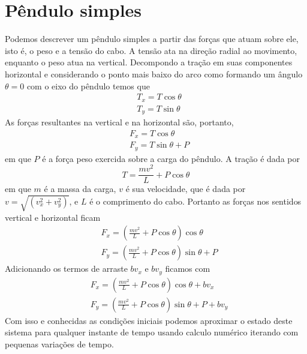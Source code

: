 \documentclass[12pt]{article}
\begin{document}
    \section*{Pêndulo simples}
    Podemos descrever um pêndulo simples a partir das forças que atuam sobre ele, isto é, o peso e
    a tensão do cabo. A tensão ata na direção radial ao movimento, enquanto o peso atua na vertical.
    Decompondo a tração em suas componentes horizontal e considerando o ponto mais baixo do arco como 
    formando um ângulo $\theta = 0$ com o eixo do pêndulo temos que
    \begin{equation*}
        \begin{aligned}
            &T_x = T\cos\theta\\
            &T_y = T\sin\theta
        \end{aligned}
    \end{equation*}
    As forças resultantes na vertical e na horizontal são, portanto, 
    \begin{equation*}
        \begin{aligned}
            &F_x = T\cos\theta\\
            &F_y = T\sin\theta + P
        \end{aligned}
    \end{equation*}
    em que $P$ é a força peso exercida sobre a carga do pêndulo. A tração é dada por
    \begin{equation*}
        T = \frac{mv^2}{L} + P\cos\theta
    \end{equation*}
    em que $m$ é a massa da carga, $v$ é sua velocidade, que é dada por $v = \sqrt{(v_x^2 + v_y^2)}$,
    e $L$ é o comprimento do cabo. Portanto as forças nos sentidos vertical e horizontal ficam
    \begin{equation*}
        \begin{aligned}
            &F_x = \left(\frac{mv^2}{L} + P\cos\theta\right)\cos\theta\\
            &F_y = \left(\frac{mv^2}{L} + P\cos\theta\right)\sin\theta + P
        \end{aligned}
    \end{equation*}
    Adicionando os termos de arraste $bv_x$ e $bv_y$ ficamos com
    \begin{equation*}
        \begin{aligned}
            &F_x = \left(\frac{mv^2}{L} + P\cos\theta\right)\cos\theta + bv_x\\
            &F_y = \left(\frac{mv^2}{L} + P\cos\theta\right)\sin\theta + P + bv_y
        \end{aligned}
    \end{equation*}
    Com isso e conhecidas as condições iniciais podemos aproximar o estado deste sistema para qualquer instante de 
    tempo usando calculo numérico iterando com pequenas variações de tempo.
    \newpage
\end{document}

